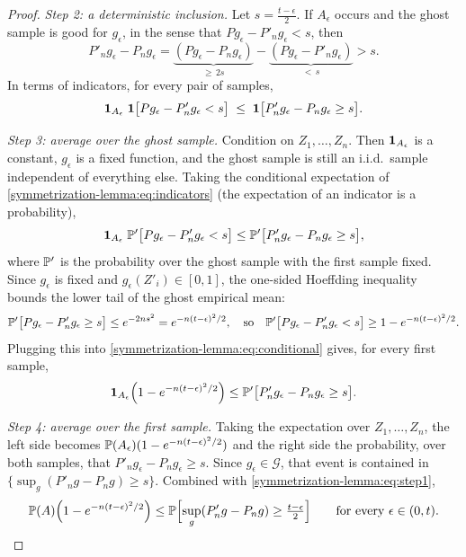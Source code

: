 \begin{notechapter}
\begin{proof}
\emph{Step 2: a deterministic inclusion.} Let $s = \frac{t-\epsilon}{2}$. If
$A_\epsilon$ occurs and the ghost sample is good for $g_\epsilon$, in the sense
that $Pg_\epsilon - P'_n g_\epsilon < s$, then
\[
  P'_n g_\epsilon - P_n g_\epsilon
  = \underbrace{(Pg_\epsilon - P_n g_\epsilon)}_{\geq\, 2s}
  - \underbrace{(Pg_\epsilon - P'_n g_\epsilon)}_{<\, s} > s .
\]
In terms of indicators, for every pair of samples,
\begin{equation}\label{symmetrization-lemma:eq:indicators}
  \mathbf{1}_{A_\epsilon}\;\mathbf{1}\bigl[Pg_\epsilon - P'_n g_\epsilon < s\bigr]
  \;\leq\; \mathbf{1}\bigl[P'_n g_\epsilon - P_n g_\epsilon \geq s\bigr].
\end{equation}

\emph{Step 3: average over the ghost sample.} Condition on $Z_1,\dots,Z_n$.
Then $\mathbf{1}_{A_\epsilon}$ is a constant, $g_\epsilon$ is a fixed function,
and the ghost sample is still an i.i.d.\ sample independent of everything
else. Taking the conditional expectation of \eqref{symmetrization-lemma:eq:indicators}
(the expectation of an indicator is a probability),
\begin{equation}\label{symmetrization-lemma:eq:conditional}
  \mathbf{1}_{A_\epsilon}\;\mathbb{P}'\bigl[Pg_\epsilon - P'_n g_\epsilon < s\bigr]
  \leq \mathbb{P}'\bigl[P'_n g_\epsilon - P_n g_\epsilon \geq s\bigr],
\end{equation}
where $\mathbb{P}'$ is the probability over the ghost sample with the first sample
fixed. Since $g_\epsilon$ is fixed and $g_\epsilon(Z'_i)\in[0,1]$, the
one-sided Hoeffding inequality bounds the lower tail of the ghost empirical
mean:
\[
  \mathbb{P}'\bigl[Pg_\epsilon - P'_n g_\epsilon \geq s\bigr] \leq e^{-2ns^2}
  = e^{-n(t-\epsilon)^2/2},
  \quad\text{so}\quad
  \mathbb{P}'\bigl[Pg_\epsilon - P'_n g_\epsilon < s\bigr] \geq 1 - e^{-n(t-\epsilon)^2/2}.
\]
Plugging this into \eqref{symmetrization-lemma:eq:conditional} gives, for
every first sample,
\[
  \mathbf{1}_{A_\epsilon}\Bigl(1 - e^{-n(t-\epsilon)^2/2}\Bigr)
  \leq \mathbb{P}'\bigl[P'_n g_\epsilon - P_n g_\epsilon \geq s\bigr].
\]

\emph{Step 4: average over the first sample.} Taking the expectation over
$Z_1,\dots,Z_n$, the left side becomes
$\mathbb{P}(A_\epsilon)(1 - e^{-n(t-\epsilon)^2/2})$ and the right side the
probability, over both samples, that $P'_ng_\epsilon - P_ng_\epsilon\geq s$.
Since $g_\epsilon\in\mathcal G$, that event is contained in
$\{\sup_g (P'_n g - P_n g) \geq s\}$. Combined with
\eqref{symmetrization-lemma:eq:step1},
\begin{equation}\label{symmetrization-lemma:eq:step4}
  \mathbb{P}(A)\Bigl(1 - e^{-n(t-\epsilon)^2/2}\Bigr)
  \leq \mathbb{P}\Bigl[\sup_g (P'_n g - P_n g) \geq \tfrac{t-\epsilon}{2}\Bigr]
  \qquad\text{for every } \epsilon\in(0,t).
\end{equation}


\end{proof}
\end{notechapter}
